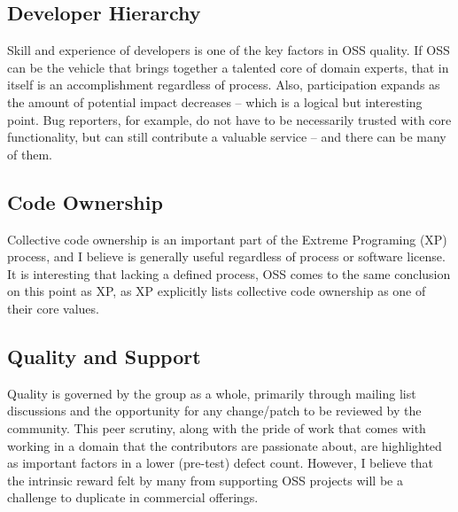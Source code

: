\documentclass{article}
\begin{document}
\subsection{Developer Hierarchy}
Skill and experience of developers is one of the key factors in OSS quality\cite{hedberg2007assuring}. If OSS can be the vehicle that brings together a talented core of domain experts, that in itself is an accomplishment regardless of process. Also, participation expands as the amount of potential impact decreases -- which is a logical but interesting point. Bug reporters, for example, do not have to be necessarily trusted with core functionality, but can still contribute a valuable service -- and there can be many of them.
   
\subsection{Code Ownership}
Collective code ownership is an important part of the Extreme Programing (XP) process, and I believe is generally useful regardless of process or software license. It is interesting that lacking a defined process, OSS comes to the same conclusion on this point as XP, as XP explicitly lists collective code ownership as one of their core values\cite{beck1999embracing}.

\subsection{Quality and Support}
Quality is governed by the group as a whole, primarily through mailing list discussions and the opportunity for any change/patch to be reviewed by the community. This peer scrutiny, along with the pride of work that comes with working in a domain that the contributors are passionate about, are highlighted as important factors in a lower (pre-test) defect count. However, I believe that the intrinsic reward\cite{lakhani2003open} felt by many from supporting OSS projects will be a challenge to duplicate in commercial offerings.
\end{document}
